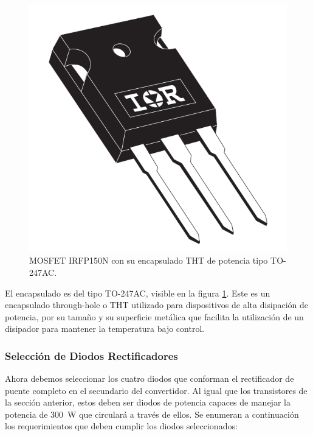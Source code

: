 \begin{figure}[h]
    \centering
    \includegraphics[scale=0.15]{Imagenes/IRFP150-TO247AC.png}
    \caption{MOSFET IRFP150N con su encapsulado THT de potencia tipo TO-247AC.}
    \label{irfp150}
\end{figure}

El encapsulado es del tipo TO-247AC, visible en la figura \ref{irfp150}. Este es un encapsulado through-hole o THT utilizado para dispositivos de alta disipación de potencia, por su tamaño y su superficie metálica que facilita la utilización de un disipador para mantener la temperatura bajo control.\\

\subsubsection{Selección de Diodos Rectificadores}

Ahora debemos seleccionar los cuatro diodos que conforman el rectificador de puente completo en el secundario del convertidor. Al igual que los transistores de la sección anterior, estos deben ser diodos de potencia capaces de manejar la potencia de \SI[]{300}[]{\watt} que circulará a través de ellos. Se enumeran a continuación los requerimientos que deben cumplir los diodos seleccionados:\\

